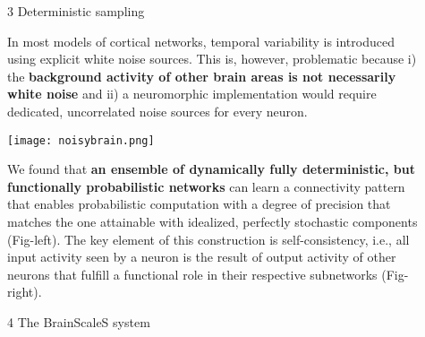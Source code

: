\begin{frame}
\begin{columns}
\begin{column}{0.99\textwidth}
\begin{columns}[t]
\begin{column}{0.32\textwidth}
				\end{column}

				\begin{column}{.01\textwidth}\end{column}

				\begin{column}{0.32\textwidth}


					\begin{block}{\large 3 Deterministic sampling}
					\blockSpaceOne

					\begin{adjustwidth}{1.cm}{1.cm}
					\justifying
					In most models of cortical networks, temporal variability is introduced using explicit white noise sources.
					This is, however, problematic because i) the \textbf{background activity of other brain areas is not necessarily white noise} and ii) a neuromorphic implementation would require dedicated, uncorrelated noise sources for every neuron. 
					\end{adjustwidth}

					\thirdBlockImSpace
					\begin{center}
						\texttt{[image: noisybrain.png]}
					\end{center}
					\thirdBlockImSpace

					\begin{adjustwidth}{1.cm}{1.cm}
					\justifying

					We  found \cite{dold2019stochasticity} that \textbf{an  ensemble  of  dynamically  fully  deterministic,  but functionally probabilistic networks} can learn a connectivity pattern that enables probabilistic computation with a degree of precision that matches the one attainable with idealized,  perfectly  stochastic  components (Fig-left).
					The  key  element  of  this  construction  is  self-consistency, i.e.,  all input activity seen by a neuron is the result of output activity of other neurons that fulfill a functional role in their respective subnetworks (Fig-right).
					
					\end{adjustwidth}

					\blockSpaceOne
					\end{block}

					\interBlockSpaceOne
					\vspace{-0.175cm}

					
				\begin{block}{\large 4 The BrainScaleS system}
					\blockSpaceOne



\end{block}
\end{column}
\end{columns}
\end{column}
\end{columns}
\end{frame}
